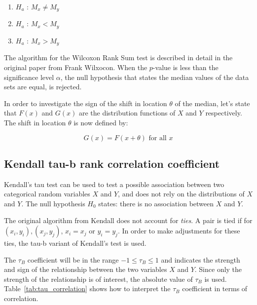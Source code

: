\begin{enumerate}
	\item $H_a$ : $M_x \neq M_y$
	\item $H_a$ : $M_x < M_y$
	\item $H_a$ : $M_x > M_y$
\end{enumerate}

The algorithm for the Wilcoxon Rank Sum test is described in detail in the original paper \cite{Wilcoxon1945} from Frank Wilxocon.  When the $p$-value is less than the significance level $\alpha$, the null hypothesis that states the median values of the data sets are equal, is rejected.

In order to investigate the sign of the shift in location $\theta$ of the median, let's state that $F(x)$ and $G(x)$ are the distribution functions of $X$ and $Y$ respectively. The shift in location $\theta$ is now defined by:

\begin{equation}
	G(x) = F(x + \theta) \mbox{ for all } x
\end{equation}	


\subsection{Kendall tau-b rank correlation coefficient} %
\label{sub:kendall_tau_b_rank_correlation_coefficient}
Kendall's tau test \cite{Kendall1938} can be used to test a possible association between two categorical random variables $X$ and $Y$, and does not rely on the distributions of $X$ and $Y$. The null hypothesis $H_0$ states: there is no association between $X$ and $Y$. 

The original algorithm from Kendall does not account for \emph{ties}. A pair is tied if for ${(x_i, y_i), (x_j, y_j)}$, $x_i = x_j$ or $y_i = y_j$. In order to make adjustments for these ties, the tau-b variant \cite{Adler1957} of Kendall's test is used.

The $\tau_B$ coefficient will be in the range $-1 \leq \tau_B \leq 1$ and indicates the strength and sign of the relationship between the two variables $X$ and $Y$. Since only the strength of the relationship is of interest, the absolute value of $\tau_B$ is used. Table~\ref{tab:tau_correlation} shows how to interpret the $\tau_B$ coefficient in terms of correlation.

